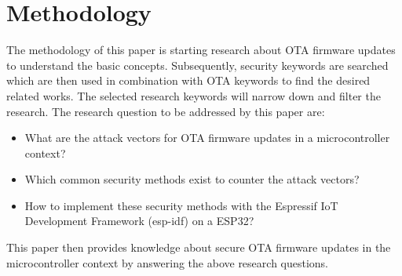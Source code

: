 \section{Methodology}
The methodology of this paper is starting research about OTA firmware updates to understand the basic concepts. Subsequently, security keywords are searched which are then used in combination with OTA keywords to find the desired related works. The selected research keywords will narrow down and filter the research. The research question to be addressed by this paper are:

\begin{itemize}
    \item What are the attack vectors for OTA firmware updates in a microcontroller context?
    \item Which common security methods exist to counter the attack vectors?
    \item How to implement these security methods with the Espressif IoT Development Framework (esp-idf) on a ESP32?
\end{itemize}

This paper then provides knowledge about secure OTA firmware updates in the microcontroller context by answering the above research questions.